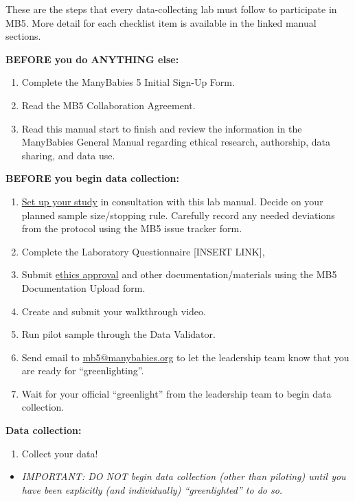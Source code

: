 \documentclass[
]{book}
\providecommand{\tightlist}{%
  \setlength{\itemsep}{0pt}\setlength{\parskip}{0pt}}
\begin{document}
These are the steps that every data-collecting lab must follow to participate in MB5. More detail for each checklist item is available in the linked manual sections.

\textbf{BEFORE you do ANYTHING else:}

\begin{enumerate}
\def\labelenumi{\arabic{enumi}.}
\tightlist
\item
  Complete the ManyBabies 5 Initial Sign-Up Form.
\item
  Read the MB5 Collaboration Agreement.
\item
  Read this manual start to finish and review the information in the ManyBabies General Manual regarding ethical research, authorship, data sharing, and data use.
\end{enumerate}

\textbf{BEFORE you begin data collection:}

\begin{enumerate}
\def\labelenumi{\arabic{enumi}.}
\setcounter{enumi}{3}
\tightlist
\item
  \hyperref[setting-up-the-experiment]{Set up your study} in consultation with this lab manual. Decide on your planned sample size/stopping rule. Carefully record any needed deviations from the protocol using the MB5 issue tracker form.
\item
  Complete the Laboratory Questionnaire {[}INSERT LINK{]},
\item
  Submit \hyperref[ethics-approval]{ethics approval} and other documentation/materials using the MB5 Documentation Upload form.
\item
  Create and submit your walkthrough video.
\item
  Run pilot sample through the Data Validator.
\item
  Send email to \url{mb5@manybabies.org} to let the leadership team know that you are ready for ``greenlighting''.
\item
  Wait for your official ``greenlight'' from the leadership team to begin data collection.
\end{enumerate}

\textbf{Data collection:}

\begin{enumerate}
\def\labelenumi{\arabic{enumi}.}
\setcounter{enumi}{10}
\tightlist
\item
  Collect your data!
\end{enumerate}

\begin{itemize}
\tightlist
\item
  \emph{IMPORTANT: DO NOT begin data collection (other than piloting) until you have been explicitly (and individually) ``greenlighted'' to do so.}
\end{itemize}
\end{document}
